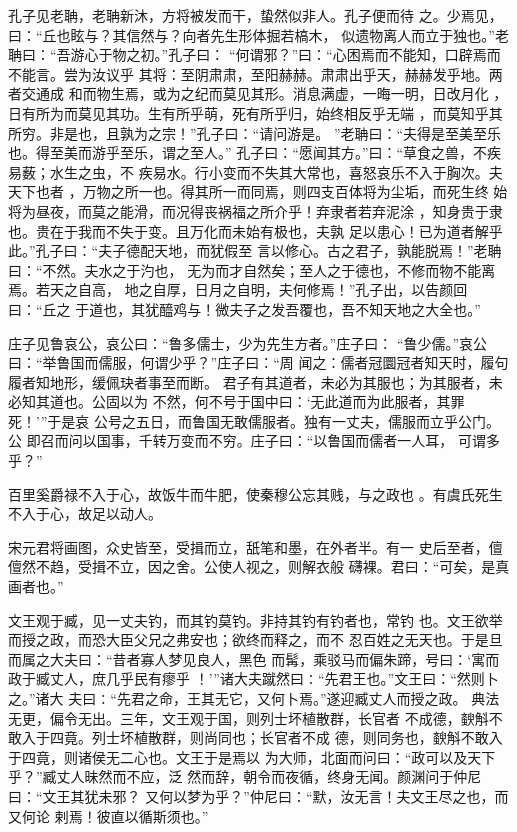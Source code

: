 \documentclass[]{article}
\begin{document}
孔子见老聃，老聃新沐，方将被发而干，蛰然似非人。孔子便而待
之。少焉见，曰：``丘也眩与？其信然与？向者先生形体掘若槁木，
似遗物离人而立于独也。''老聃曰：``吾游心于物之初。''孔子曰：
``何谓邪？''曰：``心困焉而不能知，口辟焉而不能言。尝为汝议乎
其将：至阴肃肃，至阳赫赫。肃肃出乎天，赫赫发乎地。两者交通成
和而物生焉，或为之纪而莫见其形。消息满虚，一晦一明，日改月化
，日有所为而莫见其功。生有所乎萌，死有所乎归，始终相反乎无端
，而莫知乎其所穷。非是也，且孰为之宗！''孔子曰：``请问游是。
''老聃曰：``夫得是至美至乐也。得至美而游乎至乐，谓之至人。''
孔子曰：``愿闻其方。''曰：``草食之兽，不疾易薮；水生之虫，不
疾易水。行小变而不失其大常也，喜怒哀乐不入于胸次。夫天下也者
，万物之所一也。得其所一而同焉，则四支百体将为尘垢，而死生终
始将为昼夜，而莫之能滑，而况得丧祸福之所介乎！弃隶者若弃泥涂
，知身贵于隶也。贵在于我而不失于变。且万化而未始有极也，夫孰
足以患心！已为道者解乎此。''孔子曰：``夫子德配天地，而犹假至
言以修心。古之君子，孰能脱焉！''老聃曰：``不然。夫水之于汋也，
无为而才自然矣；至人之于德也，不修而物不能离焉。若天之自高，
地之自厚，日月之自明，夫何修焉！''孔子出，以告颜回曰：``丘之
于道也，其犹醯鸡与！微夫子之发吾覆也，吾不知天地之大全也。''

庄子见鲁哀公，哀公曰：``鲁多儒士，少为先生方者。''庄子曰：
``鲁少儒。''哀公曰：``举鲁国而儒服，何谓少乎？''庄子曰：``周
闻之：儒者冠圜冠者知天时，履句履者知地形，缓佩玦者事至而断。
君子有其道者，未必为其服也；为其服者，未必知其道也。公固以为
不然，何不号于国中曰：`无此道而为此服者，其罪死！'''于是哀
公号之五日，而鲁国无敢儒服者。独有一丈夫，儒服而立乎公门。公
即召而问以国事，千转万变而不穷。庄子曰：``以鲁国而儒者一人耳，
可谓多乎？''

百里奚爵禄不入于心，故饭牛而牛肥，使秦穆公忘其贱，与之政也
。有虞氏死生不入于心，故足以动人。

宋元君将画图，众史皆至，受揖而立，舐笔和墨，在外者半。有一
史后至者，儃儃然不趋，受揖不立，因之舍。公使人视之，则解衣般
礴裸。君曰：``可矣，是真画者也。''

文王观于臧，见一丈夫钓，而其钓莫钓。非持其钓有钓者也，常钓
也。文王欲举而授之政，而恐大臣父兄之弗安也；欲终而释之，而不
忍百姓之无天也。于是旦而属之大夫曰：``昔者寡人梦见良人，黑色
而髯，乘驳马而偏朱蹄，号曰：`寓而政于臧丈人，庶几乎民有瘳乎
！'''诸大夫蹴然曰∶``先君王也。''文王曰：``然则卜之。''诸大
夫曰∶``先君之命，王其无它，又何卜焉。''遂迎臧丈人而授之政。
典法无更，偏令无出。三年，文王观于国，则列士坏植散群，长官者
不成德，斔斛不敢入于四竟。列士坏植散群，则尚同也；长官者不成
德，则同务也，斔斛不敢入于四竟，则诸侯无二心也。文王于是焉以
为大师，北面而问曰：``政可以及天下乎？''臧丈人昧然而不应，泛
然而辞，朝令而夜循，终身无闻。颜渊问于仲尼曰：``文王其犹未邪？
又何以梦为乎？''仲尼曰：``默，汝无言！夫文王尽之也，而又何论
剌焉！彼直以循斯须也。''
\end{document}
